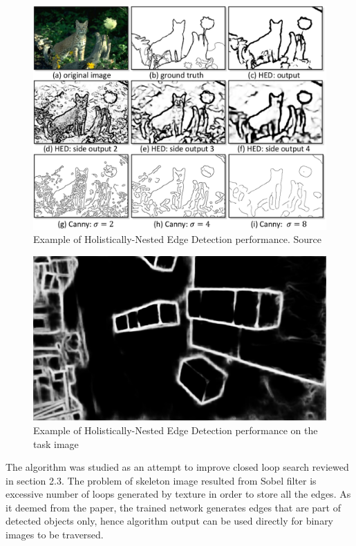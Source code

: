 \documentclass{ctuthesis}
\begin{document}
\begin{figure}[htbp]
    \centering
    \includegraphics[width=\textwidth]{hne.png}
    \caption{Example of Holistically-Nested Edge Detection performance. Source \cite{hne}}
    \label{fig:hne-ex}
\end{figure}

\begin{figure}[htbp]
    \centering
    \includegraphics[width=\textwidth]{Holistically nested NN - 2.7s.png}
    \caption{Example of Holistically-Nested Edge Detection performance on the task image}
    \label{fig:hne}
\end{figure}

The algorithm was studied as an attempt to improve closed loop search reviewed in section 2.3. The problem of skeleton image resulted from Sobel filter is excessive number of loops generated by texture in order to store all the edges. As it deemed from the paper, the trained network generates edges that are part of detected objects only, hence algorithm output can be used directly for binary images to be traversed.
\end{document}
